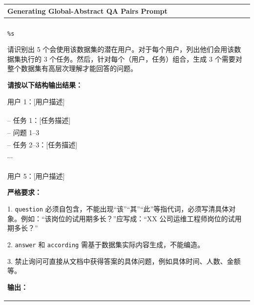 \begin{table}[!htbp]
\centering
\scriptsize
\renewcommand{\arraystretch}{1.0}

\begin{tabular}{p{}}
\toprule
\textbf{Generating Global-Abstract QA Pairs Prompt} \\
\midrule

\begin{minipage}[t]{0.92\textwidth}
\setlength{\parskip}{0pt}

根据以下数据集的描述：\\
\texttt{\%s}

\vspace{0.1em}
请识别出 5 个会使用该数据集的潜在用户。对于每个用户，列出他们会用该数据集执行的 3 个任务。然后，针对每个（用户，任务）组合，生成 3 个需要对整个数据集有高层次理解才能回答的问题。

\vspace{0.1em}
\textbf{请按以下结构输出结果：}

用户 1：[用户描述]\\
\hspace*{1em}-- 任务 1：[任务描述]\\
\hspace*{2em}-- 问题 1--3\\
\hspace*{1em}-- 任务 2--3：[任务描述]\\
$\cdots$\\
用户 5：[用户描述]

\vspace{0.1em}
\textbf{严格要求：}

1. \texttt{question} 必须自包含，不能出现“该”“其”“此”等指代词，必须写清具体对象。例如：“该岗位的试用期多长？”应写成：“XX 公司运维工程师岗位的试用期多长？”

2. \texttt{answer} 和 \texttt{according} 需基于数据集实际内容生成，不能编造。

3. 禁止询问可直接从文档中获得答案的具体问题，例如具体时间、人数、金额等。

\vspace{0.1em}
\textbf{输出：}


\end{minipage}
\end{tabular}
\end{table}
